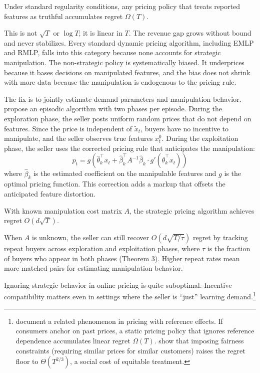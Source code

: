 \begin{theorem}
\label{thm:liu_impossibility}
Under standard regularity conditions, any pricing policy that treats reported features as truthful accumulates regret $\Omega(T)$.
\end{theorem}

This is not $\sqrt{T}$ or $\log T$; it is linear in $T$. The revenue gap grows without bound and never stabilizes. Every standard dynamic pricing algorithm, including EMLP and RMLP, falls into this category because none accounts for strategic manipulation. The non-strategic policy is systematically biased. It underprices because it bases decisions on manipulated features, and the bias does not shrink with more data because the manipulation is endogenous to the pricing rule.

The fix is to jointly estimate demand parameters and manipulation behavior. \citet{Liu2024strategic} propose an episodic algorithm with two phases per episode. During the exploration phase, the seller posts uniform random prices that do not depend on features. Since the price is independent of $\tilde{x}_t$, buyers have no incentive to manipulate, and the seller observes true features $x_t^0$. During the exploitation phase, the seller uses the corrected pricing rule that anticipates the manipulation:
\begin{equation}
\label{eq:strategic_price}
p_t = g\left(\hat{\theta}_k^\top x_t + \hat{\beta}_k^\top A^{-1} \hat{\beta}_k \cdot g'(\hat{\theta}_k^\top x_t)\right)
\end{equation}
where $\hat{\beta}_k$ is the estimated coefficient on the manipulable features and $g$ is the optimal pricing function. This correction adds a markup that offsets the anticipated feature distortion.

\begin{theorem}
\label{thm:liu_fix}
With known manipulation cost matrix $A$, the strategic pricing algorithm achieves regret $O(d\sqrt{T})$.
\end{theorem}

When $A$ is unknown, the seller can still recover $O(d\sqrt{T/\tau})$ regret by tracking repeat buyers across exploration and exploitation phases, where $\tau$ is the fraction of buyers who appear in both phases (Theorem 3). Higher repeat rates mean more matched pairs for estimating manipulation behavior.

Ignoring strategic behavior in online pricing is quite suboptimal. Incentive compatibility matters even in settings where the seller is ``just'' learning demand.\footnote{\citet{Agrawal2024ref} document a related phenomenon in pricing with reference effects. If consumers anchor on past prices, a static pricing policy that ignores reference dependence accumulates linear regret $\Omega(T)$. \citet{Chen2025fairness} show that imposing fairness constraints (requiring similar prices for similar customers) raises the regret floor to $\Theta(T^{2/3})$, a social cost of equitable treatment.}

